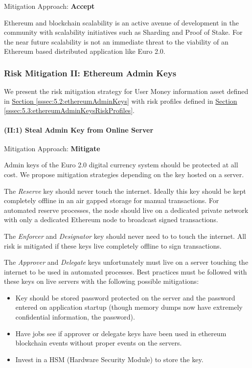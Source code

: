 \documentclass[12pt]{article} %
\newcommand{\hypersectionref}[1]{\hyperref[#1]{Section \ref{#1}}}
\begin{document}
{Mitigation Approach: \textbf{Accept}

Ethereum and blockchain scalability is an active avenue of development in the community with scalability initiatives such as Sharding\cite{shardingFaq} and Proof of Stake\cite{proofOfStakeFaq}. For the near future scalability is not an immediate threat to the viability of an Ethereum based distributed application like Euro 2.0.

\subsubsection{Risk Mitigation II: Ethereum Admin Keys} \label{sssec:5.4:riskMitigationEthereumAdminKeys}

We present the risk mitigation strategy for User Money information asset defined in \hypersectionref{sssec:5.2:ethereumAdminKeys} with risk profiles defined in \hypersectionref{sssec:5.3:ethereumAdminKeysRiskProfiles}.

\paragraph{(II:1) Steal Admin Key from Online Server}

Mitigation Approach: \textbf{Mitigate}

Admin keys of the Euro 2.0 digital currency system should be protected at all cost. We propose mitigation strategies depending on the key hosted on a server.

The \textit{Reserve} key should never touch the internet. Ideally this key should be kept completely offline in an air gapped storage for manual transactions. For automated reserve processes, the node should live on a dedicated private network with only a dedicated Ethereum node to broadcast signed transactions.

The \textit{Enforcer} and \textit{Designator} key should never need to to touch the internet. All risk is mitigated if these keys live completely offline to sign transactions.

The \textit{Approver} and \textit{Delegate} keys unfortunately must live on a server touching the internet to be used in automated processes. Best practices must be followed with these keys on live servers with the following possible mitigations:

\begin{itemize}
	\item Key should be stored password protected on the server and the password entered on application startup (though memory dumps now have extremely confidential information, the password).
	\item Have jobs see if approver or delegate keys have been used in ethereum blockchain events without proper events on the servers.
	\item Invest in a HSM (Hardware Security Module) to store the key.
\end{itemize}

}
\end{document}

